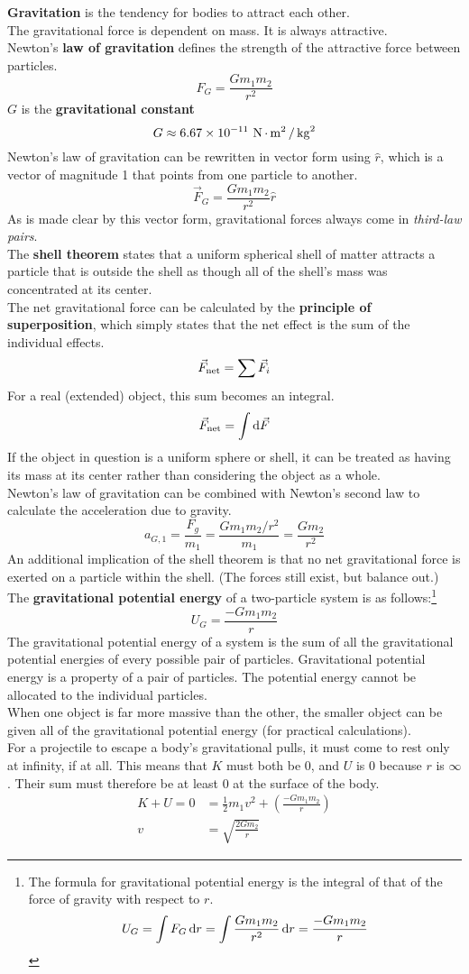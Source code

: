 \documentclass[../AP_Physics_C]{subfiles}
\begin{document}
	\textbf{Gravitation} is the tendency for bodies to attract each other. \\
	The gravitational force is dependent on mass. It is always attractive. \\
	Newton's \textbf{law of gravitation} defines the strength of the attractive force between particles.
	\[F_G = \frac{Gm_1m_2}{r^2}\]
	$G$ is the \textbf{gravitational constant}
	\[G \approx 6.67 \times 10^{-11} \,\operatorname{N}\cdot\operatorname{m}^2/\operatorname{kg}^2\]
	Newton's law of gravitation can be rewritten in vector form using $\hat{r}$, which is a vector of magnitude 1 that points from one particle to another.
	\[\vec{F}_G = \frac{Gm_1m_2}{r^2}\hat{r}\]
	As is made clear by this vector form, gravitational forces always come in \emph{third-law pairs}. \\
	The \textbf{shell theorem} states that a uniform spherical shell of matter attracts a particle that is outside the shell as though all of the shell's mass was concentrated at its center. \\
	The net gravitational force can be calculated by the \textbf{principle of superposition}, which simply states that the net effect is the sum of the individual effects.
	\[\vec{F}_{\operatorname{net}} = \sum \vec{F}_i\]
	For a real (extended) object, this sum becomes an integral.
	\[\vec{F}_{\operatorname{net}} = \int\mathrm{d}\vec{F}\]
	If the object in question is a uniform sphere or shell, it can be treated as having its mass at its center rather than considering the object as a whole. \\
	Newton's law of gravitation can be combined with Newton's second law to calculate the acceleration due to gravity.
	\[a_{G,1} = \frac{F_g}{m_1} = \frac{Gm_1m_2/r^2}{m_1} = \frac{Gm_2}{r^2}\]
	An additional implication of the shell theorem is that no net gravitational force is exerted on a particle within the shell. (The forces still exist, but balance out.) \\
	The \textbf{gravitational potential energy} of a two-particle system is as follows:\footnote{The formula for gravitational potential energy is the integral of that of the force of gravity with respect to $r$.\[U_G = \int F_G\,\mathrm{d} r = \int \frac{Gm_1m_2}{r^2}\,\mathrm{d} r = \frac{-Gm_1m_2}{r}\]}
	\[U_G = \frac{-Gm_1m_2}{r}\]
	The gravitational potential energy of a system is the sum of all the gravitational potential energies of every possible pair of particles.
	Gravitational potential energy is a property of a pair of particles. The potential energy cannot be allocated to the individual particles. \\
	When one object is far more massive than the other, the smaller object can be given all of the gravitational potential energy (for practical calculations). \\
	For a projectile to escape a body's gravitational pulls, it must come to rest only at infinity, if at all. This means that $K$ must both be 0, and $U$ is 0 because $r$ is $\infty$. Their sum must therefore be at least 0 at the surface of the body.
	\begin{align*}
		K + U = 0 &=\frac{1}{2}m_1v^2 + \left(\frac{-Gm_1m_2}{r}\right) \\
			v &= \sqrt{\frac{2Gm_2}{r}}
	\end{align*}
\end{document}
